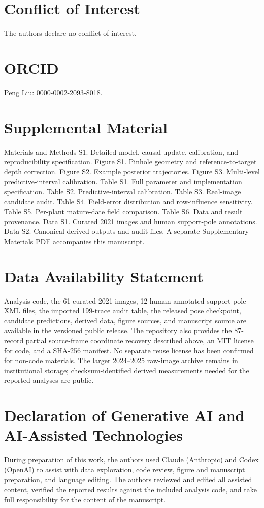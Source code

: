 \documentclass[12pt,letterpaper]{article}
\begin{document}
\section*{Conflict of Interest}
The authors declare no conflict of interest.

\section*{ORCID}
Peng Liu: \href{https://orcid.org/0000-0002-2093-8018}{0000-0002-2093-8018}.

\section*{Supplemental Material}
Materials and Methods S1. Detailed model, causal-update, calibration, and reproducibility specification. Figure S1. Pinhole geometry and reference-to-target depth correction. Figure S2. Example posterior trajectories. Figure S3. Multi-level predictive-interval calibration. Table S1. Full parameter and implementation specification. Table S2. Predictive-interval calibration. Table S3. Real-image candidate audit. Table S4. Field-error distribution and row-influence sensitivity. Table S5. Per-plant mature-date field comparison. Table S6. Data and result provenance. Data S1. Curated 2021 images and human support-pole annotations. Data S2. Canonical derived outputs and audit files. A separate Supplementary Materials PDF accompanies this manuscript.

\section*{Data Availability Statement}
Analysis code, the 61 curated 2021 images, 12 human-annotated support-pole XML files, the imported 199-trace audit table, the released pose checkpoint, candidate predictions, derived data, figure sources, and manuscript source are available in the \href{https://github.com/ChongWangStat/Bayesian-Longitudinal-Maize-Height/releases/tag/v1.2.1}{versioned public release}. The repository also provides the 87-record partial source-frame coordinate recovery described above, an MIT license for code, and a SHA-256 manifest. No separate reuse license has been confirmed for non-code materials. The larger 2024--2025 raw-image archive remains in institutional storage; checksum-identified derived measurements needed for the reported analyses are public.

\section*{Declaration of Generative AI and AI-Assisted Technologies}
During preparation of this work, the authors used Claude (Anthropic) and Codex (OpenAI) to assist with data exploration, code review, figure and manuscript preparation, and language editing. The authors reviewed and edited all assisted content, verified the reported results against the included analysis code, and take full responsibility for the content of the manuscript.

\begingroup
\small
\singlespacing
\printbibliography
\endgroup
\end{document}
